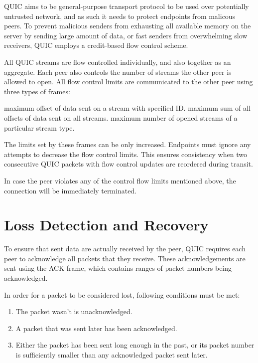 QUIC aims to be general-purpose transport protocol to be used over potentially untrusted network,
and as such it needs to protect endpoints from malicous peers. To prevent malicious senders from
exhausting all available memory on the server by sending large amount of data, or fast senders from
overwhelming slow receivers, QUIC employs a credit-based flow control scheme.

All QUIC streams are flow controlled individually, and also together as an aggregate. Each peer also controls the number of streams the other peer is allowed to open. All flow control limits are communicated to the other peer using three types of frames:

\begin{itemize}
   maximum offset of data sent on a stream with specified ID\@.
   maximum sum of all offsets of data sent on all streams.
   maximum number of opened streams of a particular stream type.
\end{itemize}

The limits set by these frames can be only increased. Endpoints must ignore any attempts to decrease
the flow control limits. This ensures consistency when two consecutive QUIC packets with flow
control updates are reordered during transit.

In case the peer violates any of the control flow limits mentioned above, the connection will be
immediately terminated.

\section{Loss Detection and Recovery}

To ensure that sent data are actually received by the peer, QUIC requires each peer to acknowledge
all packets that they receive. These acknowledgements are sent using the ACK frame, which contains
ranges of packet numbers being acknowledged.

In order for a packet to be considered lost, following conditions must be met:

\begin{enumerate}
  \item The packet wasn't is unacknowledged.
  \item A packet that was sent later has been acknowledged.
  \item Either the packet has been sent long enough in the past, or its packet number is
    sufficiently smaller than any acknowledged packet sent later.
\end{enumerate}

